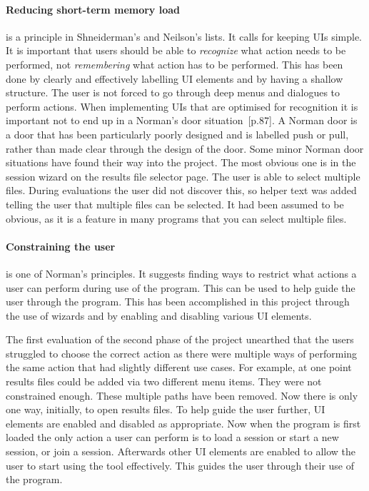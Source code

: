 \paragraph*{Reducing short-term memory load} is a principle in Shneiderman's and Neilson's lists.  It calls for keeping \acp{UI} simple.  It is important that users should be able to \textit{recognize} what action needs to be performed, not \textit{remembering} what action has to be performed.  This has been done by clearly and effectively labelling \ac{UI} elements and by having a shallow structure.  The user is not forced to go through deep menus and dialogues to perform actions.  When implementing \acp{UI} that are optimised for recognition it is important not to end up in a Norman's door situation~\cite{design_of_things}[p.87].  A Norman door is a door that has been particularly poorly designed and is labelled push or pull, rather than made clear through the design of the door.  Some minor Norman door situations have found their way into the project.  The most obvious one is in the session wizard on the results file selector page.  The user is able to select multiple files.  During evaluations the user did not discover this, so helper text was added telling the user that multiple files can be selected.  It had been assumed to be obvious, as it is a feature in many programs that you can select multiple files.

\paragraph*{Constraining the user} is one of Norman's principles.  It suggests finding ways to restrict what actions a user can perform during use of the program.  This can be used to help guide the user through the program.  This has been accomplished in this project through the use of wizards and by enabling and disabling various \ac{UI} elements.

The first evaluation of the second phase of the project unearthed that the users struggled to choose the correct action as there were multiple ways of performing the same action that had slightly different use cases.  For example, at one point results files could be added via two different menu items.  They were not constrained enough.  These multiple paths have been removed. Now there is only one way, initially, to open results files.  To help guide the user further, \ac{UI} elements are enabled and disabled as appropriate.  Now when the program is first loaded the only action a user can perform is to load a session or start a new session, or join a session.  Afterwards other \ac{UI} elements are enabled to allow the user to start using the tool effectively.  This guides the user through their use of the program.

